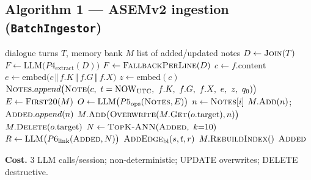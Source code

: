 \documentclass[11pt]{article}
\newcommand{\embed}{\mathrm{embed}}
\newcommand{\LLM}{\mathrm{LLM}}
\newcommand{\NOW}{\mathrm{NOW}_{\mathrm{UTC}}}
\begin{document}
\subsection*{Algorithm 1 --- ASEMv2 ingestion (\texttt{BatchIngestor})}
\begin{algorithm}[H]
\caption{ASEMv2 batch ingestion: 3 LLM calls per session.}
\label{alg:asemv2_ingest}
\begin{algorithmic}[1]
\Require dialogue turns $T$, memory bank $M$
\Ensure list of added/updated notes
\State $D \leftarrow \textsc{Join}(T)$
\State {}
\State $F \leftarrow \LLM\big(P4_{\text{extract}}(D)\big)$
 \State $F \leftarrow \textsc{FallbackPerLine}(D)$ \EndIf
\State {}
    \State $c \leftarrow f.\text{content}$
    \State $e \leftarrow \embed\big(c \,\Vert\, f.K \,\Vert\, f.G \,\Vert\, f.X\big)$
    \State $z \leftarrow \embed(c)$
    \State $\textsc{Notes}.append\big(\textsc{Note}(c,\ t=\NOW,\ f.K,\ f.G,\ f.X,\ e,\ z,\ q_0)\big)$
\EndFor
\State {}
\State $E \leftarrow \textsc{First20}(M)$
\State $O \leftarrow \LLM\big(P5_{\text{ops}}(\textsc{Notes}, E)\big)$
\State {}
    \State $n \leftarrow \textsc{Notes}[i]$
        \State $M.\textsc{Add}(n)$; \State $\textsc{Added}.append(n)$
        \State $M.\textsc{Add}\big(\textsc{Overwrite}(M.\textsc{Get}(o.\text{target}), n)\big)$
        \State $M.\textsc{Delete}(o.\text{target})$
    \EndIf
\EndFor
\State {}
\State $N \leftarrow \textsc{TopK-ANN}(\textsc{Added},\ k{=}10)$ 
\State $R \leftarrow \LLM\big(P6_{\text{link}}(\textsc{Added}, N)\big)$
 \State $\textsc{AddEdge}_{\text{bi}}(s, t, r)$ \EndFor
\State {}
\State $M.\textsc{RebuildIndex}()$
\State \Return $\textsc{Added}$
\end{algorithmic}
\end{algorithm}

\textbf{Cost.} 3 LLM calls/session; non-deterministic; UPDATE overwrites; DELETE destructive.
\end{document}
